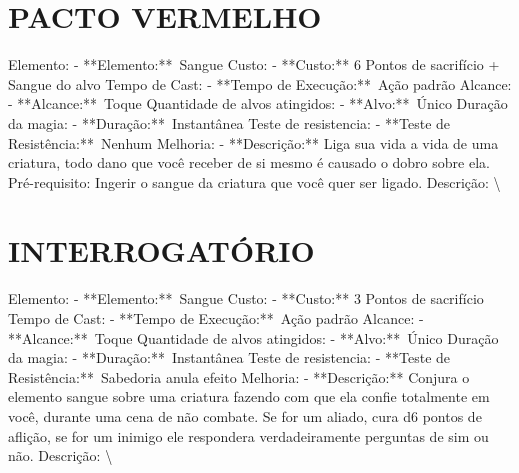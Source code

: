 \documentclass{article}%
\begin{document}
\section{PACTO VERMELHO}%
\label{sec:PACTOVERMELHO}%
Elemento: {-} **Elemento:**~Sangue\newline%
Custo: {-} **Custo:** 6 Pontos de sacrifício + Sangue do alvo\newline%
Tempo de Cast: {-} **Tempo de Execução:**~Ação padrão\newline%
Alcance: {-} **Alcance:**~Toque\newline%
Quantidade de alvos atingidos: {-} **Alvo:**~Único\newline%
Duração da magia: {-} **Duração:**~Instantânea\newline%
Teste de resistencia: {-} **Teste de Resistência:**~Nenhum\newline%
Melhoria: {-} **Descrição:** Liga sua vida a vida de uma criatura, todo dano que você receber de si mesmo é causado o dobro sobre ela. Pré{-}requisito: Ingerir o sangue da criatura que você quer ser ligado.\newline%
Descrição: \textbackslash{}

%
\section{INTERROGATÓRIO}%
\label{sec:INTERROGATRIO}%
Elemento: {-} **Elemento:**~Sangue\newline%
Custo: {-} **Custo:** 3 Pontos de sacrifício\newline%
Tempo de Cast: {-} **Tempo de Execução:**~Ação padrão\newline%
Alcance: {-} **Alcance:**~Toque\newline%
Quantidade de alvos atingidos: {-} **Alvo:**~Único\newline%
Duração da magia: {-} **Duração:**~Instantânea\newline%
Teste de resistencia: {-} **Teste de Resistência:**~Sabedoria anula efeito\newline%
Melhoria: {-} **Descrição:** Conjura o elemento sangue sobre uma criatura fazendo com que ela confie totalmente em você, durante uma cena de não combate. Se for um aliado, cura d6 pontos de aflição, se for um inimigo ele respondera verdadeiramente perguntas de sim ou não.\newline%
Descrição: \textbackslash{}

%
\end{document}
